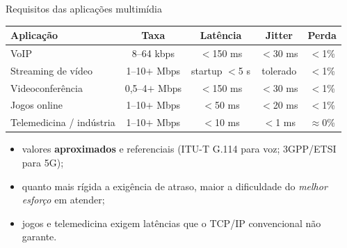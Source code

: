 \documentclass[aspectratio=169,11pt]{beamer}
\begin{document}
\begin{frame}{Requisitos das aplicações multimídia}
  \begin{center}
    \scriptsize
    \begin{tabular}{@{}lcccc@{}}
      \toprule
      \textbf{Aplicação} & \textbf{Taxa} & \textbf{Latência} & \textbf{Jitter} & \textbf{Perda}\\
      \midrule
      VoIP & 8--64 kbps & $<$150 ms & $<$30 ms & $<$1\%\\
      Streaming de vídeo & 1--10$+$ Mbps & startup $<$5 s & tolerado & $<$1\%\\
      Videoconferência & 0,5--4$+$ Mbps & $<$150 ms & $<$30 ms & $<$1\%\\
      Jogos online & 1--10$+$ Mbps & $<$50 ms & $<$20 ms & $<$1\%\\
      Telemedicina / indústria & 1--10$+$ Mbps & $<$10 ms & $<$1 ms & $\approx$0\%\\
      \bottomrule
    \end{tabular}
  \end{center}
  \begin{itemize}
    \item valores \textbf{aproximados} e referenciais (ITU-T G.114 para voz; 3GPP/ETSI para 5G);
    \item quanto mais rígida a exigência de atraso, maior a dificuldade do \emph{melhor esforço} em atender;
    \item jogos e telemedicina exigem latências que o TCP/IP convencional não garante.
  \end{itemize}
\end{frame}
\end{document}
